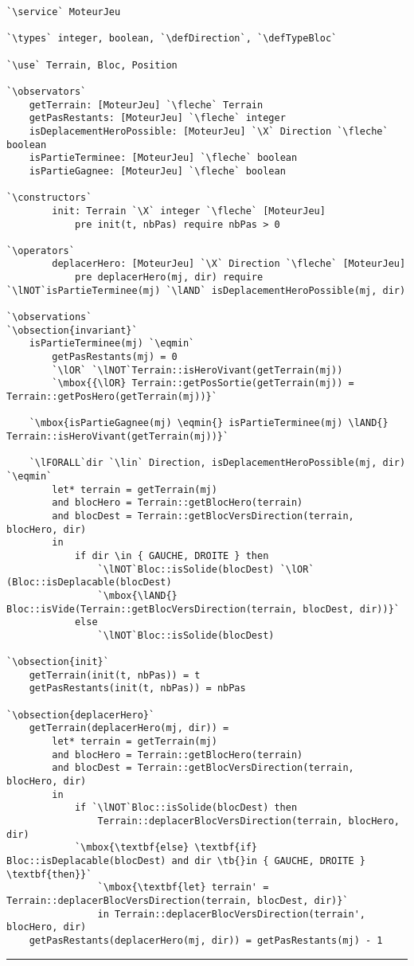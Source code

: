 \documentclass{article}
\newcommand{\tb}{\textbackslash{}}
\newcommand{\fleche}{$\rightarrow{}$}
\newcommand{\X}{$\times{}$}
\newcommand{\eqmin}{$\overset{min}{=}$}
\newcommand{\lAND}{$\land$}
\newcommand{\lOR}{$\lor$}
\newcommand{\lNOT}{$\lnot$}
\newcommand{\lFORALL}{$\forall$}
\newcommand{\lin}{$\in$}
\newcommand{\specsec}[1]{\Large{\textbf{#1:}}}
\newcommand{\service}{\specsec {Service}}
\newcommand{\types}{\specsec {Types}}
\newcommand{\use}{\specsec {Use}}
\newcommand{\observators}{\specsec {Observators}}
\newcommand{\constructors}{\specsec {Constructors}}
\newcommand{\operators}{\specsec {Operators}}
\newcommand{\observations}{\specsec {Observations}}
\newcommand{\obsection}[1]{\textbf{[#1]}}
\newcommand{\TypeBloc}{TypeBloc}
\newcommand{\defTypeBloc}{\mbox{enum \TypeBloc}~\{~VIDE, TERRE, MUR, HERO, SORTIE\_FERMEE, SORTIE\_OUVERTE, ROCHER, DIAMANT~\}}
\newcommand{\Direction}{Direction}
\newcommand{\defDirection}{\mbox{enum \Direction}~\{~HAUT, BAS, GAUCHE, DROITE~\}}
\begin{document}
\begin{lstlisting}[caption=Service MoteurJeu]
`\service` MoteurJeu

`\types` integer, boolean, `\defDirection`, `\defTypeBloc`

`\use` Terrain, Bloc, Position

`\observators`
	getTerrain: [MoteurJeu] `\fleche` Terrain
	getPasRestants: [MoteurJeu] `\fleche` integer
	isDeplacementHeroPossible: [MoteurJeu] `\X` Direction `\fleche` boolean
	isPartieTerminee: [MoteurJeu] `\fleche` boolean
	isPartieGagnee: [MoteurJeu] `\fleche` boolean
	
`\constructors`
		init: Terrain `\X` integer `\fleche` [MoteurJeu]
			pre init(t, nbPas) require nbPas > 0
		
`\operators`
		deplacerHero: [MoteurJeu] `\X` Direction `\fleche` [MoteurJeu]
			pre deplacerHero(mj, dir) require `\lNOT`isPartieTerminee(mj) `\lAND` isDeplacementHeroPossible(mj, dir)

`\observations`
`\obsection{invariant}`
	isPartieTerminee(mj) `\eqmin`
		getPasRestants(mj) = 0
		`\lOR` `\lNOT`Terrain::isHeroVivant(getTerrain(mj))
		`\mbox{{\lOR} Terrain::getPosSortie(getTerrain(mj)) = Terrain::getPosHero(getTerrain(mj))}`
		
	`\mbox{isPartieGagnee(mj) \eqmin{} isPartieTerminee(mj) \lAND{} Terrain::isHeroVivant(getTerrain(mj))}`
	
	`\lFORALL`dir `\lin` Direction, isDeplacementHeroPossible(mj, dir) `\eqmin`
		let* terrain = getTerrain(mj)
		and blocHero = Terrain::getBlocHero(terrain)
		and blocDest = Terrain::getBlocVersDirection(terrain, blocHero, dir)
		in
			if dir \in { GAUCHE, DROITE } then
				`\lNOT`Bloc::isSolide(blocDest) `\lOR` (Bloc::isDeplacable(blocDest)
				`\mbox{\lAND{} Bloc::isVide(Terrain::getBlocVersDirection(terrain, blocDest, dir))}`
			else
				`\lNOT`Bloc::isSolide(blocDest)
	
`\obsection{init}`
	getTerrain(init(t, nbPas)) = t
	getPasRestants(init(t, nbPas)) = nbPas

`\obsection{deplacerHero}`
	getTerrain(deplacerHero(mj, dir)) =
		let* terrain = getTerrain(mj)
		and blocHero = Terrain::getBlocHero(terrain)
		and blocDest = Terrain::getBlocVersDirection(terrain, blocHero, dir)
		in
			if `\lNOT`Bloc::isSolide(blocDest) then
				Terrain::deplacerBlocVersDirection(terrain, blocHero, dir)
			`\mbox{\textbf{else} \textbf{if} Bloc::isDeplacable(blocDest) and dir \tb{}in { GAUCHE, DROITE } \textbf{then}}`
				`\mbox{\textbf{let} terrain' = Terrain::deplacerBlocVersDirection(terrain, blocDest, dir)}`
				in Terrain::deplacerBlocVersDirection(terrain', blocHero, dir)
	getPasRestants(deplacerHero(mj, dir)) = getPasRestants(mj) - 1					
\end{lstlisting}

\hrule
\end{document}
